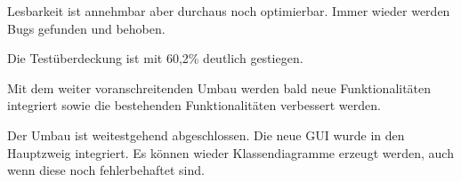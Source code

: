 
\nsecend


\nsecend %


\nsecend%


\nsecend%


\nsecend


\nsecend

Lesbarkeit ist annehmbar aber durchaus noch optimierbar. Immer wieder werden Bugs gefunden und behoben.
\nsecend%

Die Testüberdeckung ist mit 60,2\% deutlich gestiegen.
\nsecend%


\nsecend%

Mit dem weiter voranschreitenden Umbau werden bald neue Funktionalitäten integriert sowie die bestehenden Funktionalitäten verbessert werden.
\nsecend%

Der Umbau ist weitestgehend abgeschlossen. Die neue GUI wurde in den Hauptzweig integriert. Es können wieder Klassendiagramme erzeugt werden, auch wenn diese noch fehlerbehaftet sind.
\nsecend%